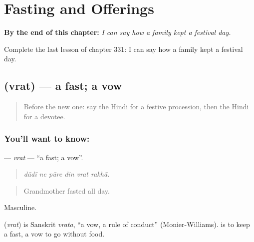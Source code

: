 
\chapter{Fasting and Offerings}
\label{ch:hi-fasting-and-offerings}

\begin{chapteropening}
\textbf{By the end of this chapter:} \emph{I can say how a family kept a festival day.}

Complete the last lesson of chapter 331: I can say how a family kept a festival day.
\end{chapteropening}

\section[\texorpdfstring{\hi{व्रत} (vrat)}{व्रत (vrat)}]{ (vrat) — a fast; a vow}

\label{lesson:HI-C331-vrat}



\begin{quote}
Before the new one: say the Hindi for a festive procession, then the Hindi for a devotee.
\end{quote}

\subsection*{You'll want to know: }
\textbf{} — \emph{vrat} — \textquotedblleft{}a fast; a vow\textquotedblright{}.

\begin{quote}
     
\end{quote}

\begin{quote}
\emph{dādī ne pūre din vrat rakhā.}
\end{quote}

\begin{quote}
Grandmother fasted all day.
\end{quote}

Masculine.

\begin{cousinweb}
\textbf{} (\emph{vrat}) is Sanskrit \emph{vrata}, \textquotedblleft{}a vow, a rule of conduct\textquotedblright{} (Monier-Williams). \textbf{ } is to keep a fast, a vow to go without food.
\end{cousinweb}

